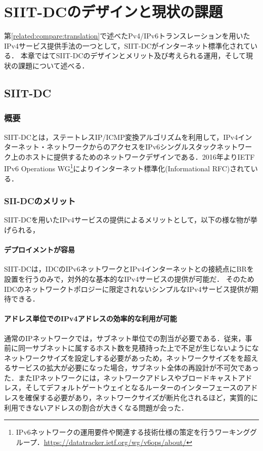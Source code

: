 \chapter{SIIT-DCのデザインと現状の課題}
\label{issue}
第\ref{related:compare:translation}で述べたPv4/IPv6トランスレーションを用いたIPv4サービス提供手法の一つとして，SIIT-DCがインターネット標準化されている．
本章ではてSIIT-DCのデザインとメリット及び考えられる運用，そして現状の課題について述べる．
\section{SIIT-DC}
\label{issue:siit-dc}


\subsection{概要}
SIIT-DCとは，ステートレスIP/ICMP変換アルゴリズム\cite{RFC7915}を利用して，IPv4インターネット・ネットワークからのアクセスをIPv6シングルスタックネットワーク上のホストに提供するためのネットワークデザインである．2016年よりIETF IPv6 Operations WG\footnote{IPv6ネットワークの運用要件や関連する技術仕様の策定を行うワーキンググループ．\url{https://datatracker.ietf.org/wg/v6ops/about/}}によりインターネット標準化(Informational RFC)されている\cite{RFC7755}．


\subsection{SII-DCのメリット}
\label{issue-siit-dc-merit}
SIIT-DCを用いたIPv4サービスの提供によるメリットとして，以下の様な物が挙げられる，

\subsubsection{デプロイメントが容易}
SIIT-DCは，IDCのIPv6ネットワークとIPv4インターネットとの接続点にBRを設置を行うのみで，対外的な基本的なIPv4サービスの提供が可能だ．
そのためIDCのネットワークトポロジーに限定されないシンプルなIPv4サービス提供が期待できる．

\subsubsection{アドレス単位でのIPv4アドレスの効率的な利用が可能}
通常のIPネットワークでは，サブネット単位での割当が必要である．従来，事前に同一サブネットに属するホスト数を見積持った上で不足が生じないようになネットワークサイズを設定しする必要があっため，ネットワークサイズをを超えるサービスの拡大が必要になった場合，サブネット全体の再設計が不可欠であった．またIPネットワークには，ネットワークアドレスやブロードキャストアドレス，そしてデフォルトゲートウェイとなるルーターのインターフェースのアドレスを確保する必要があり，ネットワークサイズが断片化されるほど，実質的に利用できないアドレスの割合が大きくなる問題が会った．

